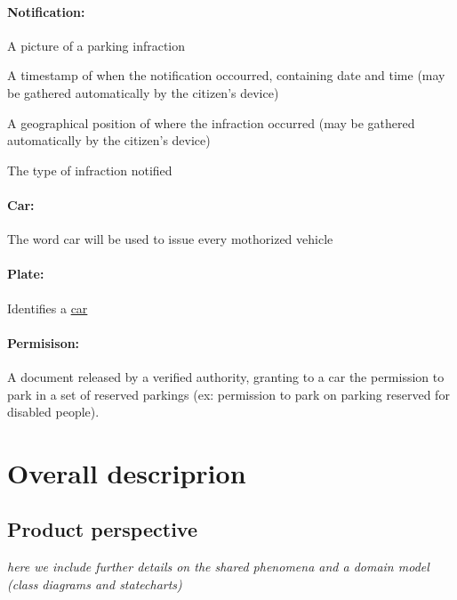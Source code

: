 \documentclass{article}
\begin{document}
		\paragraph{Notification:} 
			\begin{list}{-}{Represents a set of data submitted by any user composed by:}
				\item A picture of a parking infraction
				\item A timestamp of when the notification occourred, containing date and time (may be gathered automatically by the citizen's device)
				\item A geographical position of where the infraction occurred (may be gathered automatically by the citizen's device)
				\item The type of infraction notified
			\end{list}
		\paragraph{Car:}The word car will be used to issue every mothorized vehicle
		\paragraph{Plate:}Identifies a \underline{car}
		\paragraph{Permisison:}A document released by a verified authority, granting to a car the permission to park in a set of reserved parkings (ex: permission to park on parking reserved for disabled people). 
		

\section{Overall descriprion}

	\subsection{Product perspective} \textit{here we include further details on the shared phenomena and a domain model (class diagrams and statecharts)}
	
\end{document}
